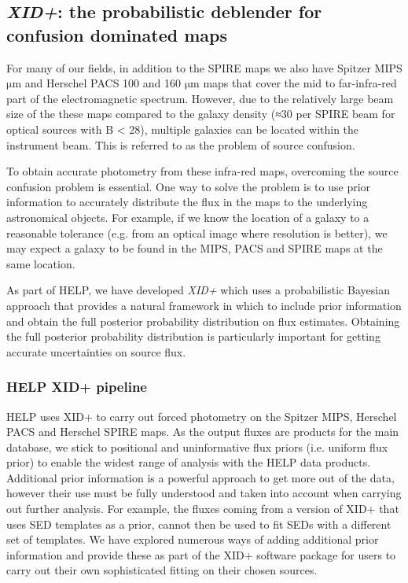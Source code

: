 \documentclass[usenatbib]{mnras}
\begin{document}
\subsection{\emph{XID+}: the probabilistic deblender for confusion dominated maps}
For many of our fields, in addition to the SPIRE maps we also have Spitzer MIPS $\mathrm{\mu m}$ and Herschel PACS 100 and 160 $\mathrm{\mu m}$ maps that cover the mid to far-infra-red part of the electromagnetic spectrum. However, due to the relatively large beam size of the these maps compared to the galaxy density (≈30 per SPIRE beam for optical sources with B < 28), multiple galaxies can be located within the instrument beam. This is referred to as the problem of source confusion.

To obtain accurate photometry from these infra-red maps, overcoming the source confusion problem is essential. One way to solve the problem is to use prior information to accurately distribute the flux in the maps to the underlying astronomical objects. For example, if we know the location of a galaxy to a reasonable tolerance (e.g. from an optical image where resolution is better), we may expect a galaxy to be found in the MIPS, PACS and SPIRE maps at the same location.

As part of HELP, we have developed \emph{XID+} \citep{Hurley:2017} which uses a probabilistic Bayesian approach that provides a natural framework in which to include prior information and obtain the full posterior probability distribution on flux estimates. Obtaining the full posterior probability distribution is particularly important for getting accurate uncertainties on source flux.

\subsubsection{HELP XID+ pipeline}
HELP uses XID+ to carry out forced photometry on the Spitzer MIPS, Herschel PACS and Herschel SPIRE maps. As the output fluxes are products for the main database, we stick to positional and uninformative flux priors (i.e. uniform flux prior) to enable the widest range of analysis with the HELP data products. Additional prior information is a powerful approach to get more out of the data, however their use must be fully understood and taken into account when carrying out further analysis. For example, the fluxes coming from a version of XID+ that uses SED templates as a prior, cannot then be used to fit SEDs with a different set of templates. We have explored numerous ways of adding additional prior information and provide these as part of the XID+ software package for users to carry out their own sophisticated fitting on their chosen sources. 
\end{document}
